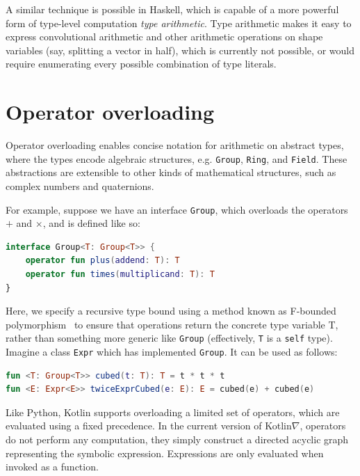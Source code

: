 \documentclass[12pt,initial,twoside,maitrise]{dms}
\numberwithin{equation}{section}
\numberwithin{table}{chapter}
\numberwithin{figure}{chapter}
\begin{document}
A similar technique is possible in Haskell, which is capable of a more powerful form of type-level computation \textit{type arithmetic}. Type arithmetic makes it easy to express convolutional arithmetic and other arithmetic operations on shape variables (say, splitting a vector in half), which is currently not possible, or would require enumerating every possible combination of type literals.

\section{Operator overloading}\label{sec:operator-overloading}

Operator overloading enables concise notation for arithmetic on abstract types, where the types encode algebraic structures, e.g. \texttt{Group}, \texttt{Ring}, and \texttt{Field}. These abstractions are extensible to other kinds of mathematical structures, such as complex numbers and quaternions.

For example, suppose we have an interface \texttt{Group}, which overloads the operators $+$ and $\times$, and is defined like so:

\begin{lstlisting}[caption={Simple code listing.}, language=Kotlin]
interface Group<T: Group<T>> {
    operator fun plus(addend: T): T
    operator fun times(multiplicand: T): T
}
\end{lstlisting}

Here, we specify a recursive type bound using a method known as F-bounded polymorphism~\cite{canning1989f} to ensure that operations return the concrete type variable T, rather than something more generic like \texttt{Group} (effectively, \texttt{T} is a \texttt{self} type). Imagine a class \texttt{Expr} which has implemented \texttt{Group}. It can be used as follows:

\begin{lstlisting}[caption={Simple code listing.}, language=Kotlin]
fun <T: Group<T>> cubed(t: T): T = t * t * t
fun <E: Expr<E>> twiceExprCubed(e: E): E = cubed(e) + cubed(e)
\end{lstlisting}

Like Python, Kotlin supports overloading a limited set of operators, which are evaluated using a fixed precedence. In the current version of Kotlin$\nabla$, operators do not perform any computation, they simply construct a directed acyclic graph representing the symbolic expression. Expressions are only evaluated when invoked as a function.
\end{document}
